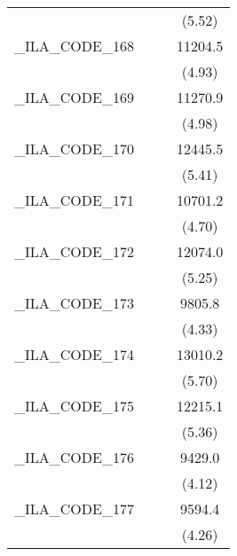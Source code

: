 {\begin{tabular}{l*{3}{c}}
            &                     &                     &      (5.52)         \\
[1em]
\_ILA\_CODE\_168&                     &                     &     11204.5\sym{***}\\
            &                     &                     &      (4.93)         \\
[1em]
\_ILA\_CODE\_169&                     &                     &     11270.9\sym{***}\\
            &                     &                     &      (4.98)         \\
[1em]
\_ILA\_CODE\_170&                     &                     &     12445.5\sym{***}\\
            &                     &                     &      (5.41)         \\
[1em]
\_ILA\_CODE\_171&                     &                     &     10701.2\sym{***}\\
            &                     &                     &      (4.70)         \\
[1em]
\_ILA\_CODE\_172&                     &                     &     12074.0\sym{***}\\
            &                     &                     &      (5.25)         \\
[1em]
\_ILA\_CODE\_173&                     &                     &      9805.8\sym{***}\\
            &                     &                     &      (4.33)         \\
[1em]
\_ILA\_CODE\_174&                     &                     &     13010.2\sym{***}\\
            &                     &                     &      (5.70)         \\
[1em]
\_ILA\_CODE\_175&                     &                     &     12215.1\sym{***}\\
            &                     &                     &      (5.36)         \\
[1em]
\_ILA\_CODE\_176&                     &                     &      9429.0\sym{***}\\
            &                     &                     &      (4.12)         \\
[1em]
\_ILA\_CODE\_177&                     &                     &      9594.4\sym{***}\\
            &                     &                     &      (4.26)         \\

\end{tabular}}
